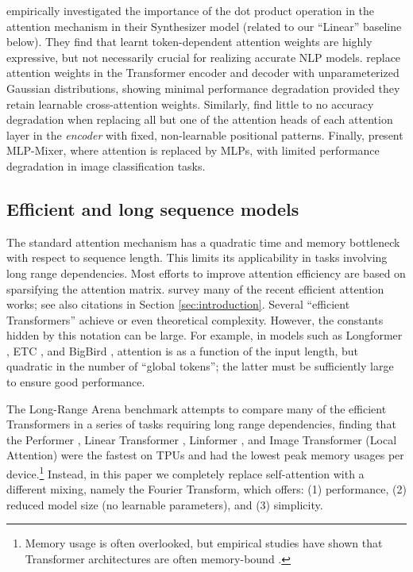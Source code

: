\documentclass[11pt]{article}
\renewcommand{\O}[1]{}
\begin{document}
\citet{tay2020synthesizer} empirically investigated the importance of the dot product operation in the attention mechanism in their Synthesizer model (related to our ``Linear'' baseline below). They find that learnt token-dependent attention weights are highly expressive, but not necessarily crucial for realizing accurate NLP models. \citet{you2020hard} replace attention weights in the Transformer encoder and decoder with unparameterized Gaussian distributions, showing minimal performance degradation provided they retain learnable cross-attention weights. Similarly, \citet{raganato2020fixed} find little to no accuracy degradation when replacing all but one of the attention heads of each attention layer in the \emph{encoder} with fixed, non-learnable positional patterns. Finally, \citet{tolstikhin2021mlp} present MLP-Mixer, where attention is replaced by MLPs, with limited performance degradation in image classification tasks. 


\subsection{Efficient and long sequence models}
\label{subsec:efficient_transformers}

The standard attention mechanism \citep{vaswani2017attention} has a quadratic time and memory bottleneck with respect to sequence length. This limits its applicability in tasks involving long range dependencies. Most efforts to improve attention efficiency are based on sparsifying the attention matrix. \citet{tay2020efficient} survey many of the recent efficient attention works; see also citations in Section \ref{sec:introduction}. Several ``efficient Transformers'' achieve \O{N\sqrt{N}} or even \O{N} theoretical complexity. However, the constants hidden by this notation can be large. For example, in models such as Longformer \citep{beltagy2020longformer}, ETC \citep{ainslie2020etc}, and BigBird \citep{zaheer2020big}, attention is \O{N} as a function of the input length, but quadratic in the number of ``global tokens''; the latter must be sufficiently large to ensure good performance.

The Long-Range Arena benchmark \citep{tay2020long} attempts to compare many of the efficient Transformers in a series of tasks requiring long range dependencies, finding that the Performer \citep{choromanski2020rethinking}, Linear Transformer \citep{katharopoulos2020transformers}, Linformer \citep{wang2020linformer}, and Image Transformer (Local Attention) \citep{parmar2018image} were the fastest on TPUs and had the lowest peak memory usages per device.\footnote{Memory usage is often overlooked, but empirical studies have shown that Transformer architectures are often memory-bound \citep{ivanov2020data, shazeer2019fast}.} Instead, in this paper we completely replace self-attention with a different mixing, namely the Fourier Transform, which offers: (1) performance,
(2) reduced model size (no learnable parameters), and (3) simplicity.
\end{document}
